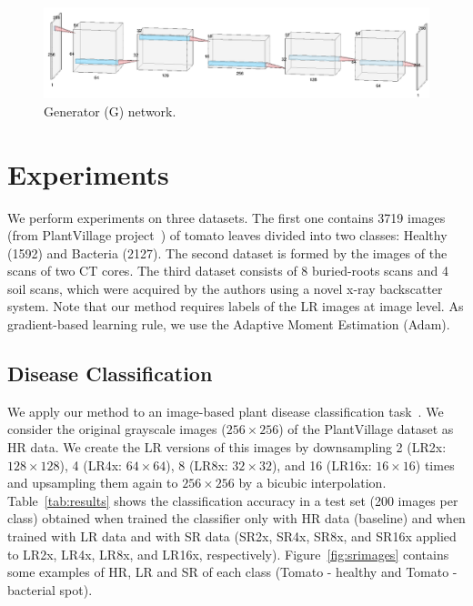 \documentclass[10pt,twocolumn,letterpaper]{article}
\begin{document}
\begin{figure}[h]
\begin{center}
\includegraphics[scale=0.30]{G_net.png}
\end{center}
\label{fig:G_net}
\caption{Generator (G) network.}
\end{figure}


\section{Experiments}


We perform experiments on three datasets. The first one contains 3719 images (from PlantVillage project~\cite{Hughes2015}) of tomato leaves divided into two classes: Healthy (1592) and Bacteria (2127). The second dataset is formed by the images of the scans of two CT cores.  The third dataset consists of 8 buried-roots scans and 4 soil scans, which were acquired by the authors using a novel x-ray backscatter system. Note that our method requires labels of the LR images at image level. As gradient-based learning rule, we use the Adaptive Moment Estimation (Adam). 

\subsection{Disease Classification}
We apply our method to an image-based plant disease classification task~\cite{Mohanty2016}. We consider the original grayscale images ($256\times 256$) of the PlantVillage dataset as HR data. We create the LR versions of this images by downsampling 2 (LR2x: $128\times 128$), 4 (LR4x: $64\times 64$), 8 (LR8x: $32\times 32$), and 16 (LR16x: $16\times 16$) times and upsampling them again to $256\times 256$ by a bicubic interpolation. Table~\ref{tab:results} shows the classification accuracy in a test set (200 images per class) obtained when trained the classifier only with HR data (baseline) and when trained with LR data and with SR data (SR2x, SR4x, SR8x, and SR16x applied to LR2x, LR4x, LR8x, and LR16x, respectively). Figure~\ref{fig:srimages} contains some examples of HR, LR and SR of each class (Tomato - healthy and Tomato - bacterial spot).
\end{document}

